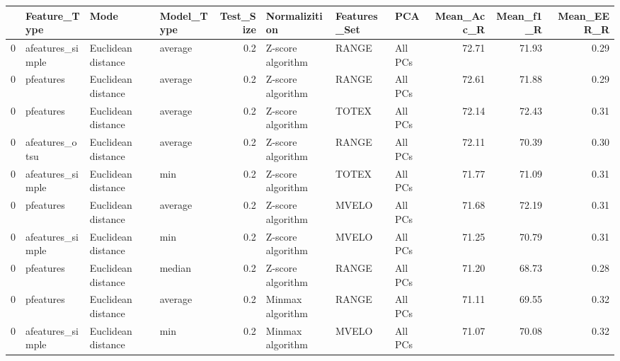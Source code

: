 \begin{tabular}{llllrlllrrr}
\toprule
{} &      Feature\_Type &                Mode & Model\_Type &  Test\_Size &      Normalizition & Features\_Set &      PCA &  Mean\_Acc\_R &  Mean\_f1\_R &  Mean\_EER\_R \\
\midrule
0 &  afeatures\_simple &  Euclidean distance &    average &        0.2 &  Z-score algorithm &        RANGE &  All PCs &       72.71 &      71.93 &        0.29 \\
0 &         pfeatures &  Euclidean distance &    average &        0.2 &  Z-score algorithm &        RANGE &  All PCs &       72.61 &      71.88 &        0.29 \\
0 &         pfeatures &  Euclidean distance &    average &        0.2 &  Z-score algorithm &        TOTEX &  All PCs &       72.14 &      72.43 &        0.31 \\
0 &    afeatures\_otsu &  Euclidean distance &    average &        0.2 &  Z-score algorithm &        RANGE &  All PCs &       72.11 &      70.39 &        0.30 \\
0 &  afeatures\_simple &  Euclidean distance &        min &        0.2 &  Z-score algorithm &        TOTEX &  All PCs &       71.77 &      71.09 &        0.31 \\
0 &         pfeatures &  Euclidean distance &    average &        0.2 &  Z-score algorithm &        MVELO &  All PCs &       71.68 &      72.19 &        0.31 \\
0 &  afeatures\_simple &  Euclidean distance &        min &        0.2 &  Z-score algorithm &        MVELO &  All PCs &       71.25 &      70.79 &        0.31 \\
0 &         pfeatures &  Euclidean distance &     median &        0.2 &  Z-score algorithm &        RANGE &  All PCs &       71.20 &      68.73 &        0.28 \\
0 &         pfeatures &  Euclidean distance &    average &        0.2 &   Minmax algorithm &        RANGE &  All PCs &       71.11 &      69.55 &        0.32 \\
0 &  afeatures\_simple &  Euclidean distance &        min &        0.2 &   Minmax algorithm &        MVELO &  All PCs &       71.07 &      70.08 &        0.32 \\
\bottomrule
\end{tabular}
